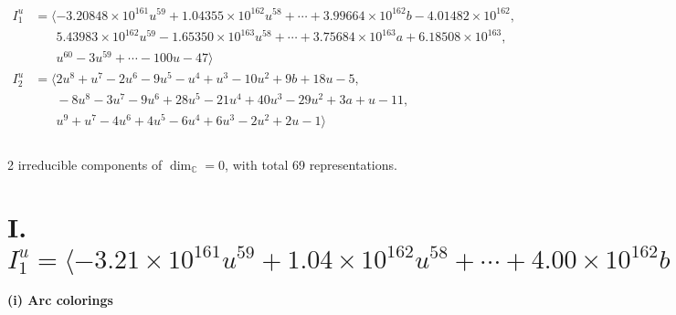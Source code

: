\documentclass[1p]{elsarticle_modified}
\theoremstyle{definition}
\begin{document}
\begin{align*}
I^u_{1}&=\langle 
-3.20848\times10^{161} u^{59}+1.04355\times10^{162} u^{58}+\cdots+3.99664\times10^{162} b-4.01482\times10^{162},\\
\phantom{I^u_{1}}&\phantom{= \langle  }5.43983\times10^{162} u^{59}-1.65350\times10^{163} u^{58}+\cdots+3.75684\times10^{163} a+6.18508\times10^{163},\\
\phantom{I^u_{1}}&\phantom{= \langle  }u^{60}-3 u^{59}+\cdots-100 u-47\rangle \\
I^u_{2}&=\langle 
2 u^8+u^7-2 u^6-9 u^5- u^4+u^3-10 u^2+9 b+18 u-5,\\
\phantom{I^u_{2}}&\phantom{= \langle  }-8 u^8-3 u^7-9 u^6+28 u^5-21 u^4+40 u^3-29 u^2+3 a+u-11,\\
\phantom{I^u_{2}}&\phantom{= \langle  }u^9+u^7-4 u^6+4 u^5-6 u^4+6 u^3-2 u^2+2 u-1\rangle \\
\\
\end{align*}
\raggedright * 2 irreducible components of $\dim_{\mathbb{C}}=0$, with total 69 representations.\\
\newpage
\renewcommand{\arraystretch}{1}
\centering \section*{I. $I^u_{1}= \langle -3.21\times10^{161} u^{59}+1.04\times10^{162} u^{58}+\cdots+4.00\times10^{162} b-4.01\times10^{162},\;5.44\times10^{162} u^{59}-1.65\times10^{163} u^{58}+\cdots+3.76\times10^{163} a+6.19\times10^{163},\;u^{60}-3 u^{59}+\cdots-100 u-47 \rangle$}
\flushleft \textbf{(i) Arc colorings}\\
\end{document}
